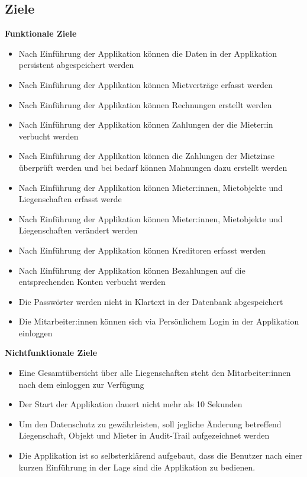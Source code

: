 \subsection{Ziele}
\textbf{Funktionale Ziele}
\begin{itemize}
  \item Nach Einführung der Applikation können die Daten in der Applikation persistent abgespeichert werden
  \item Nach Einführung der Applikation können Mietverträge erfasst werden
  \item Nach Einführung der Applikation können Rechnungen erstellt werden
  \item Nach Einführung der Applikation können Zahlungen der die Mieter:in verbucht werden
  \item Nach Einführung der Applikation können die Zahlungen der Mietzinse überprüft werden und bei bedarf können Mahnungen dazu erstellt werden
  \item Nach Einführung der Applikation können Mieter:innen, Mietobjekte und Liegenschaften erfasst werde
  \item Nach Einführung der Applikation können Mieter:innen, Mietobjekte und Liegenschaften verändert werden
  \item Nach Einführung der Applikation können Kreditoren erfasst werden
  \item Nach Einführung der Applikation können Bezahlungen auf die entsprechenden Konten verbucht werden
  \item Die Passwörter werden nicht in Klartext in der Datenbank abgespeichert
  \item Die Mitarbeiter:innen können sich via Persönlichem Login in der Applikation einloggen
\end{itemize}

\textbf{Nichtfunktionale Ziele}
\begin{itemize}
  \item Eine Gesamtübersicht über alle Liegenschaften steht den Mitarbeiter:innen nach dem einloggen zur Verfügung
  \item Der Start der Applikation dauert nicht mehr als 10 Sekunden
  \item Um den Datenschutz zu gewährleisten, soll jegliche Änderung betreffend Liegenschaft, Objekt und Mieter in Audit-Trail aufgezeichnet werden
  \item Die Applikation ist so selbsterklärend aufgebaut, dass die Benutzer nach einer kurzen Einführung in der Lage sind die Applikation zu bedienen.
\end{itemize}


